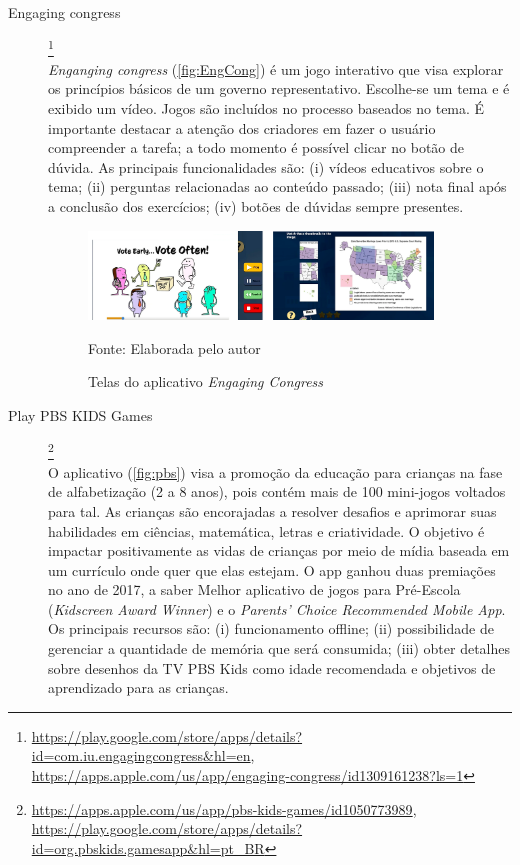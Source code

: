 \begin{description}

\item[Engaging congress]\footnote{\url{https://play.google.com/store/apps/details?id=com.iu.engagingcongress&hl=en}, \url{https://apps.apple.com/us/app/engaging-congress/id1309161238?ls=1}} \hfill \\
\textit{Enganging congress} (\autoref{fig:EngCong}) é um jogo interativo que visa explorar os princípios básicos de um governo representativo. Escolhe-se um tema e é exibido um vídeo. Jogos são incluídos no processo baseados no tema. É importante destacar a atenção dos criadores em fazer o usuário compreender a tarefa; a todo momento é possível clicar no botão de dúvida. As principais funcionalidades são: (i) vídeos educativos sobre o tema; (ii) perguntas relacionadas ao conteúdo passado; (iii) nota final após a conclusão dos exercícios; (iv) botões de dúvidas sempre presentes.

\begin{figure}[ht!]
\centering
    \caption{Telas do aplicativo \textit{Engaging Congress}}
    \label{fig:EngCong}
    \includegraphics[width=0.9\textwidth]{Figuras/engagingcongress.png}
    
    Fonte: Elaborada pelo autor
\end{figure}

\item[Play PBS KIDS Games]\footnote{\url{https://apps.apple.com/us/app/pbs-kids-games/id1050773989}, \url{https://play.google.com/store/apps/details?id=org.pbskids.gamesapp&hl=pt_BR}} \hfill \\
O aplicativo (\autoref{fig:pbs}) visa a promoção da educação para crianças na fase de alfabetização (2 a 8 anos), pois contém mais de 100 mini-jogos voltados para tal. As crianças são encorajadas a resolver desafios e aprimorar suas habilidades em ciências, matemática, letras e criatividade. O objetivo é impactar positivamente as vidas de crianças por meio de mídia baseada em um currículo onde quer que elas estejam. O app ganhou duas premiações no ano de 2017, a saber Melhor aplicativo de jogos para Pré-Escola (\textit{Kidscreen Award Winner}) e o \textit{Parents' Choice Recommended Mobile App}. Os principais recursos são: (i) funcionamento offline; (ii) possibilidade de gerenciar a quantidade de memória que será consumida; (iii) obter detalhes sobre desenhos da TV PBS Kids como idade recomendada e objetivos de aprendizado para as crianças.


\end{description}
